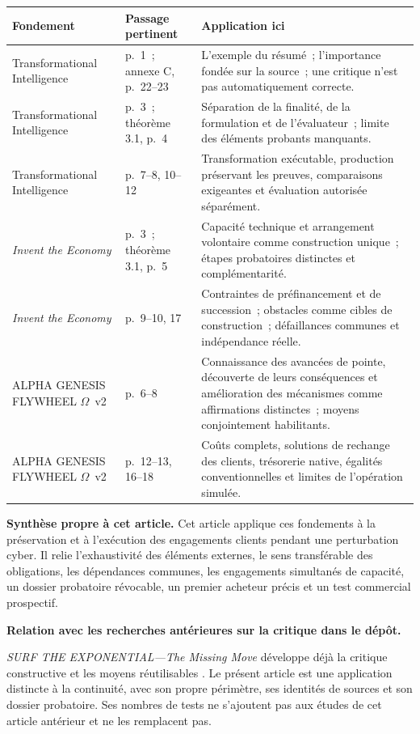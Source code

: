 \documentclass[11pt,a4paper]{article}
\newcommand{\ti}{Transformational Intelligence}
\newcommand{\genesis}{ALPHA GENESIS FLYWHEEL $\Omega$}
\begin{document}
\begin{longtable}{P{.28\textwidth}P{.24\textwidth}P{.40\textwidth}}
\toprule
\textbf{Fondement} & \textbf{Passage pertinent} & \textbf{Application ici}\\
\midrule
\endhead
\ti & p.~1~; annexe C, p.~22--23 & L’exemple du résumé~; l’importance fondée sur la source~; une critique n’est pas automatiquement correcte.\\
\ti & p.~3~; théorème 3.1, p.~4 & Séparation de la finalité, de la formulation et de l’évaluateur~; limite des éléments probants manquants.\\
\ti & p.~7--8, 10--12 & Transformation exécutable, production préservant les preuves, comparaisons exigeantes et évaluation autorisée séparément.\\
\emph{Invent the Economy} & p.~3~; théorème 3.1, p.~5 & Capacité technique et arrangement volontaire comme construction unique~; étapes probatoires distinctes et complémentarité.\\
\emph{Invent the Economy} & p.~9--10, 17 & Contraintes de préfinancement et de succession~; obstacles comme cibles de construction~; défaillances communes et indépendance réelle.\\
\genesis\ v2 & p.~6--8 & Connaissance des avancées de pointe, découverte de leurs conséquences et amélioration des mécanismes comme affirmations distinctes~; moyens conjointement habilitants.\\
\genesis\ v2 & p.~12--13, 16--18 & Coûts complets, solutions de rechange des clients, trésorerie native, égalités conventionnelles et limites de l’opération simulée.\\
\bottomrule
\end{longtable}

\textbf{Synthèse propre à cet article.} Cet article applique ces fondements à la préservation et à l’exécution des engagements clients pendant une perturbation cyber. Il relie l’exhaustivité des éléments externes, le sens transférable des obligations, les dépendances communes, les engagements simultanés de capacité, un dossier probatoire révocable, un premier acheteur précis et un test commercial prospectif.

\textbf{Relation avec les recherches antérieures sur la critique dans le dépôt.}\par
\emph{SURF THE EXPONENTIAL---The Missing Move} développe déjà la critique constructive et les moyens réutilisables \cite{boucherSurf}. Le présent article est une application distincte à la continuité, avec son propre périmètre, ses identités de sources et son dossier probatoire. Ses nombres de tests ne s’ajoutent pas aux études de cet article antérieur et ne les remplacent pas.
\end{document}

